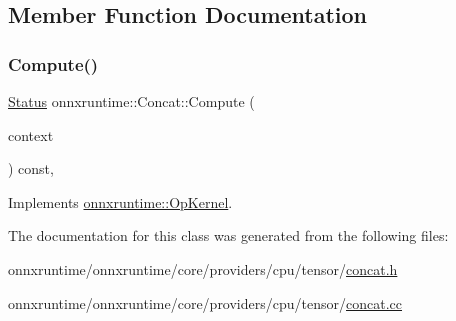 \subsection{Member Function Documentation}
\mbox{\label{classonnxruntime_1_1Concat_aa778440d6e8b31cc239af8937522b6c0}} 
\subsubsection{\texorpdfstring{Compute()}{Compute()}}
{\footnotesize\ttfamily \mbox{\hyperlink{classonnxruntime_1_1common_1_1Status}{Status}} onnxruntime\+::\+Concat\+::\+Compute (\begin{DoxyParamCaption}\item[{\mbox{\hyperlink{classonnxruntime_1_1OpKernelContext}{Op\+Kernel\+Context}} $\ast$}]{context }\end{DoxyParamCaption}) const\hspace{0.3cm}{\ttfamily [override]}, {\ttfamily [virtual]}}



Implements \mbox{\hyperlink{classonnxruntime_1_1OpKernel_a9eca8656a78b1b3ab9d3351a12798650}{onnxruntime\+::\+Op\+Kernel}}.



The documentation for this class was generated from the following files\+:\begin{DoxyCompactItemize}
\item 
onnxruntime/onnxruntime/core/providers/cpu/tensor/\mbox{\hyperlink{cpu_2tensor_2concat_8h}{concat.\+h}}\item 
onnxruntime/onnxruntime/core/providers/cpu/tensor/\mbox{\hyperlink{cpu_2tensor_2concat_8cc}{concat.\+cc}}\end{DoxyCompactItemize}
